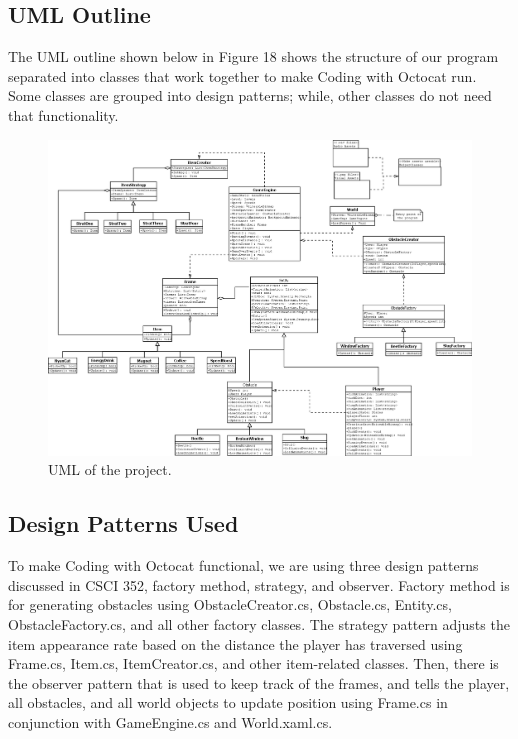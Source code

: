 \documentclass[10pt,conference,onecolumn,compsoc]{IEEEtran}
\begin{document}
\subsection{UML Outline}
The UML outline shown below in Figure 18 shows the structure of our program separated into classes that work together to make Coding with Octocat run. Some classes are grouped into design patterns; while, other classes do not need that functionality.

\clearpage

\begin{figure}[!ht]
\centering
\includegraphics[scale=.29]{GameUML.png}
\caption{UML of the project.}
\end{figure}

\subsection{Design Patterns Used}
To make Coding with Octocat functional, we are using three design patterns discussed in CSCI 352, factory method, strategy, and observer. Factory method is for generating obstacles using ObstacleCreator.cs, Obstacle.cs, Entity.cs, ObstacleFactory.cs, and all other factory classes. The strategy pattern adjusts the item appearance rate based on the distance the player has traversed using Frame.cs, Item.cs, ItemCreator.cs, and other item-related classes. Then, there is the observer pattern that is used to keep track of the frames, and tells the player, all obstacles, and all world objects to update position using Frame.cs in conjunction with GameEngine.cs and World.xaml.cs.
\end{document}
